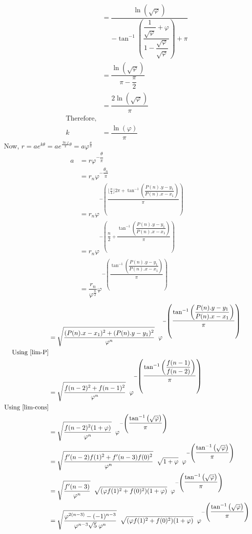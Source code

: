 \documentclass[preprint,12pt]{elsarticle}
\begin{document}
	\begin{align*}
	&= \dfrac{\ln{\left(\sqrt{\varphi}\right)}}
	{-\tan^{-1}\left({\dfrac{\dfrac{1}{\sqrt{\varphi}}+\varphi}{1 - \dfrac{\sqrt{\varphi}}{\sqrt{\varphi}}}}\right) + \pi}\\
	&= \dfrac{\ln{\left(\sqrt{\varphi}\right)}}{\pi - \dfrac{\pi}{2}}\\
	&= \dfrac{2\ln{\left(\sqrt{\varphi}\right)}}{\pi}\\
	\text{Therefore,}\\
	k &= \dfrac{\ln{\left(\varphi\right)}}{\pi}
	\end{align*}
	Now, 
	{\large$r = ae^{k\theta} = 
		ae^{\frac{\ln{\varphi}}{\pi}\theta} = a\varphi^{\frac{\theta}{\pi}}$}
	\begin{align*}
	a &= r\varphi^{-\dfrac{\theta}{\pi}}\\
	&= r_n\varphi^{-\dfrac{\theta_n}{\pi}}\\
	&= r_n\varphi^{-\left(\dfrac{\lfloor\frac{n}{4}\rfloor2\pi + \tan^{-1}{\left(\dfrac{P(n).y-y_1}{P(n).x - x_1}\right)}}{\pi}\right)}\\
	&= r_n\varphi^{-\left(\dfrac{n}{2} + \dfrac{ \tan^{-1}{\left(\dfrac{P(n).y-y_1}{P(n).x - x_1}\right)}}{\pi}\right)}\\
	&= \dfrac{r_n}{\varphi^{\frac{n}{2}}}\varphi^{-\left(\dfrac{ \tan^{-1}{\left(\dfrac{P(n).y-y_1}{P(n).x - x_1}\right)}}{\pi}\right)}
	\end{align*}
	\begin{align*}
	&= \sqrt{\dfrac{(P(n).x-x_1)^2 + (P(n).y-y_1)^2}{\varphi^n}}\hspace{2mm}\varphi^{-\left(\dfrac{ \tan^{-1}{\left(\dfrac{P(n).y-y_1}{P(n).x - x_1}\right)}}{\pi}\right)}\\
	\text{Using \ref{lim-P}}\\
	&= \sqrt{\dfrac{f(n-2)^2 + f(n-1)^2}{\varphi^n}}\hspace{2mm}\varphi^{-\left(\dfrac{ \tan^{-1}{\left(\dfrac{f(n-1)}{f(n-2)}\right)}}{\pi}\right)}\\
	\text{Using \ref{lim-cons}}\\
	&= \sqrt{\dfrac{f(n-2)^2 (1 + \varphi)}{\varphi^n}}\hspace{2mm}\varphi^{-\left(\dfrac{ \tan^{-1}{\left(\sqrt{\varphi}\right)}}{\pi}\right)}\\
	&= \sqrt{\dfrac{f'(n-2)f(1)^2+f'(n-3)f(0)^2}{\varphi^n}}\hspace{2mm}\sqrt{1+\varphi}\hspace{2mm}\varphi^{-\left(\dfrac{ \tan^{-1}{\left(\sqrt{\varphi}\right)}}{\pi}\right)}\\
	&= \sqrt{\dfrac{f'(n-3)}{\varphi^n}}\hspace{2mm}\sqrt{(\varphi f(1)^2 + f(0)^2)(1+\varphi)}\hspace{2mm}\varphi^{-\left(\dfrac{ \tan^{-1}{\left(\sqrt{\varphi}\right)}}{\pi}\right)}\\
	&= \sqrt{\dfrac{\varphi^{2(n-3)}-(-1)^{n-3}}{\varphi^{n-3}\sqrt{5}\hspace{1mm}\varphi^n}}\hspace{2mm}\sqrt{(\varphi f(1)^2 + f(0)^2)(1+\varphi)}\hspace{2mm}\varphi^{-\left(\dfrac{ \tan^{-1}{\left(\sqrt{\varphi}\right)}}{\pi}\right)}
	\end{align*}
\end{document}

